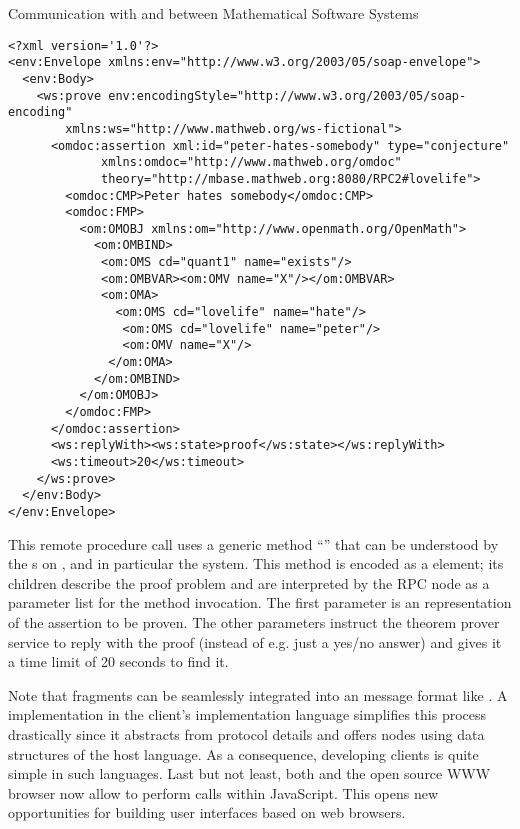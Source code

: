 \begin{tchapter}[id=rpc,short=Communication between Systems]{Communication with and between Mathematical Software Systems}
\begin{lstlisting}[label=lst:rpc-prover,
  caption={A {\soap} RPC call to {\spass}}]
<?xml version='1.0'?>
<env:Envelope xmlns:env="http://www.w3.org/2003/05/soap-envelope">
  <env:Body>
    <ws:prove env:encodingStyle="http://www.w3.org/2003/05/soap-encoding"
        xmlns:ws="http://www.mathweb.org/ws-fictional">
      <omdoc:assertion xml:id="peter-hates-somebody" type="conjecture"
             xmlns:omdoc="http://www.mathweb.org/omdoc"
             theory="http://mbase.mathweb.org:8080/RPC2#lovelife"> 
        <omdoc:CMP>Peter hates somebody</omdoc:CMP> 
        <omdoc:FMP> 
          <om:OMOBJ xmlns:om="http://www.openmath.org/OpenMath"> 
            <om:OMBIND> 
             <om:OMS cd="quant1" name="exists"/> 
             <om:OMBVAR><om:OMV name="X"/></om:OMBVAR> 
             <om:OMA> 
               <om:OMS cd="lovelife" name="hate"/> 
                <om:OMS cd="lovelife" name="peter"/> 
                <om:OMV name="X"/> 
              </om:OMA> 
            </om:OMBIND> 
          </om:OMOBJ> 
        </omdoc:FMP> 
      </omdoc:assertion> 
      <ws:replyWith><ws:state>proof</ws:state></ws:replyWith>
      <ws:timeout>20</ws:timeout>
    </ws:prove>
  </env:Body>
</env:Envelope>
\end{lstlisting}
This {\soap} remote procedure call uses a generic method ``{}'' that can be
understood by the {s} on {\mathwebsb}, and in
particular the {\spass} system. This method is encoded as a {}
element; its children describe the proof problem and are interpreted by the {\soap} RPC
node as a parameter list for the method invocation.  The first parameter is an {\omdoc}
representation of the assertion to be proven. The other parameters instruct the theorem
prover service to reply with the proof (instead of e.g. just a yes/no answer) and gives it
a time limit of 20 seconds to find it.

Note that {\omdoc} fragments can be seamlessly integrated into an {\xml} message format
like {\soap}. A {\soap} implementation in the client's implementation language simplifies
this process drastically since it abstracts from {\http} protocol details and offers
{\soap} nodes using data structures of the host language.  As a consequence, developing
{\mathweb} clients is quite simple in such languages.  Last but not least, both {\msie}
and the open source WWW browser {\firefox} now allow to perform {\soap} calls within
JavaScript. This opens new opportunities for building user interfaces based on web
browsers.


\end{tchapter}
